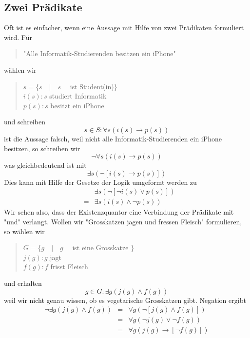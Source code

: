 \documentclass{report}
\begin{document}
\subsection{Zwei Prädikate}
Oft ist es einfacher, wenn eine Aussage mit Hilfe von zwei Prädikaten formuliert wird. Für
\begin{quote}"Alle Informatik-Studierenden besitzen ein iPhone"\end{quote}
wählen wir
\begin{quote}$s = \{s \quad | \quad s \quad$ ist Student(in)$\}$ \\
$i(s) : s$ studiert Informatik\\
$p(s): s$ besitzt ein iPhone\end{quote}
und schreiben
\begin{equation}s \in S: \forall s (i(s) \to p(s))\end{equation}
ist die Aussage falsch, weil nicht alle Informatik-Studierenden ein iPhone besitzen, so schreiben wir
\begin{equation}\lnot \forall s (i(s) \to p(s))\end{equation}
was gleichbedeutend ist mit
\begin{equation}\exists s (\lnot [i(s) \to p(s)])\end{equation}
Dies kann mit Hilfe der Gesetze der Logik umgeformt werden zu
\begin{eqnarray}& & \exists s (\lnot [\lnot i(s) \lor p(s)]) \nonumber \\
&=& \exists s (i(s) \land \lnot p(s))\end{eqnarray}
Wir sehen also, dass der Existenzquantor eine Verbindung der Prädikate mit "und" verlangt. Wollen wir "Grosskatzen jagen und fressen Fleisch" formulieren, so wählen wir
\begin{quote}$G = \{ g \quad | \quad g \quad$ ist eine Grosskatze $\}$\\
$j(g) : g$ jagt\\
$f(g) : f$ frisst Fleisch\end{quote}
und erhalten
\begin{equation}g \in G : \exists g (j(g) \land f(g))\end{equation}
weil wir nicht genau wissen, ob es vegetarische Grosskatzen gibt. Negation ergibt
\begin{eqnarray}\lnot \exists g (j(g) \land f(g)) &=& \forall g (\lnot [j(g) \land f(g)])\nonumber \\
&=& \forall g (\lnot j(g) \lor \lnot f(g)) \nonumber \\
&=& \forall g (j(g) \to [\lnot f(g)])\end{eqnarray}
\end{document}
